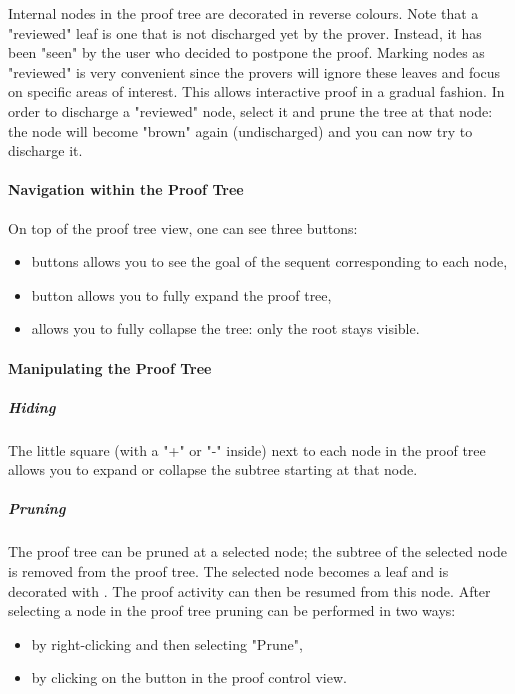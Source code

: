 Internal nodes in the proof tree are decorated in reverse colours. Note that a "reviewed" leaf is one that is not discharged yet by the prover. Instead, it has been "seen" by the user who decided to postpone the proof. Marking nodes as "reviewed" is very convenient since the provers will ignore these leaves and focus on specific areas of interest. This allows interactive proof in a gradual fashion. In order to discharge a "reviewed" node, select it and prune the tree at that node: the node will become "brown" again (undischarged) and you can now try to discharge it. 

\paragraph{Navigation within the Proof Tree}

On top of the proof tree view, one can see three buttons:

\begin{itemize}
	\item {} buttons allows you to see the goal of the sequent corresponding to each node,
	\item {} button allows you to fully expand the proof tree,
	\item {} allows you to fully collapse the tree: only the root stays visible. 
\end{itemize}

\paragraph{Manipulating the Proof Tree}

\subparagraph{Hiding}

The little square (with a "+" or "-" inside) next to each node in the proof tree allows you to expand or collapse the subtree starting at that node. 

\subparagraph{Pruning}

The proof tree can be pruned at a selected node; the subtree of the selected node is removed from the proof tree. The selected node becomes a leaf and is decorated with . The proof activity can then be resumed from this node. After selecting a node in the proof tree pruning can be performed in two ways:

\begin{itemize}
	\item by right-clicking and then selecting "Prune",
	\item by clicking on the  button in the proof control view. 
\end{itemize}

